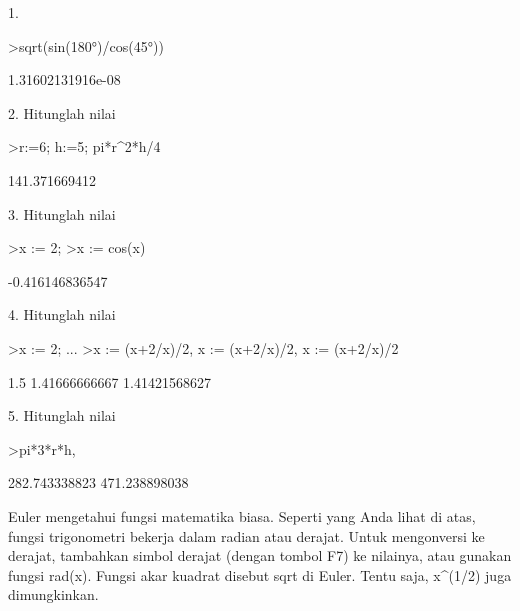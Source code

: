 \documentclass[a4paper,10pt]{article}
\begin{document}
\begin{eulernotebook}
\begin{eulercomment}
\begin{eulercomment}
\begin{eulercomment}
\begin{eulercomment}
\begin{eulercomment}
1.
\end{eulercomment}
\begin{eulerprompt}
>sqrt(sin(180°)/cos(45°))
\end{eulerprompt}
\begin{euleroutput}
  1.31602131916e-08
\end{euleroutput}
\begin{eulercomment}
2. Hitunglah nilai
\end{eulercomment}
\begin{eulerprompt}
>r:=6; h:=5; pi*r^2*h/4
\end{eulerprompt}
\begin{euleroutput}
  141.371669412
\end{euleroutput}
\begin{eulercomment}
3. Hitunglah nilai
\end{eulercomment}
\begin{eulerprompt}
>x := 2;
>x := cos(x) 
\end{eulerprompt}
\begin{euleroutput}
  -0.416146836547
\end{euleroutput}
\begin{eulercomment}
4. Hitunglah nilai
\end{eulercomment}
\begin{eulerprompt}
>x := 2; ... 
>x := (x+2/x)/2, x := (x+2/x)/2, x := (x+2/x)/2
\end{eulerprompt}
\begin{euleroutput}
  1.5
  1.41666666667
  1.41421568627
\end{euleroutput}
\begin{eulercomment}
5. Hitunglah nilai
\end{eulercomment}
\begin{eulerprompt}
>pi*3*r*h, %
\end{eulerprompt}
\begin{euleroutput}
  282.743338823
  471.238898038
\end{euleroutput}
\begin{eulercomment}
Euler mengetahui fungsi matematika biasa. Seperti yang Anda lihat di
atas, fungsi trigonometri bekerja dalam radian atau derajat. Untuk
mengonversi ke derajat, tambahkan simbol derajat (dengan tombol F7) ke
nilainya, atau gunakan fungsi rad(x). Fungsi akar kuadrat disebut sqrt
di Euler. Tentu saja, x\textasciicircum{}(1/2) juga dimungkinkan.


\end{eulercomment}
\end{eulercomment}
\end{eulercomment}
\end{eulercomment}
\end{eulercomment}
\end{eulernotebook}
\end{document}
